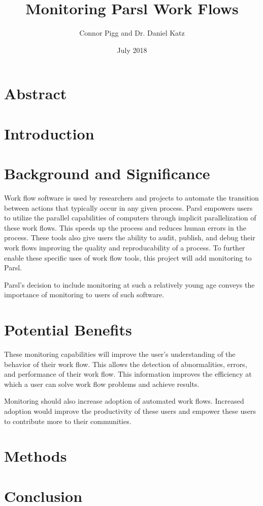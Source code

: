 \documentclass{article}
\title{Monitoring Parsl Work Flows}
\author{Connor Pigg and Dr. Daniel Katz}
\date{July 2018}
\begin{document}
\maketitle

\section{Abstract}

\pagebreak

\section{Introduction}


\section{Background and Significance}
Work flow software is used by researchers and projects to automate the transition between actions that typically occur in any given process.
Parsl empowers users to utilize the parallel capabilities of computers through implicit parallelization of these work flows.
This speeds up the process and reduces human errors in the process.
These tools also give users the ability to audit, publish, and debug their work flows improving the quality and reproducability of a process.
To further enable these specific uses of work flow tools, this project will add monitoring to Parsl.

Parsl's decision to include monitoring at such a relatively young age conveys the importance of monitoring to users of such software.

\section{Potential Benefits}
These monitoring capabilities will improve the user's understanding of the behavior of their work flow.
This allows the detection of abnormalities, errors, and performance of their work flow.
This information improves the efficiency at which a user can solve work flow problems and achieve results.

Monitoring should also increase adoption of automated work flows.
Increased adoption would improve the productivity of these users and empower these users to contribute more to their communities.

\section{Methods}


\section{Conclusion}




\end{document}
